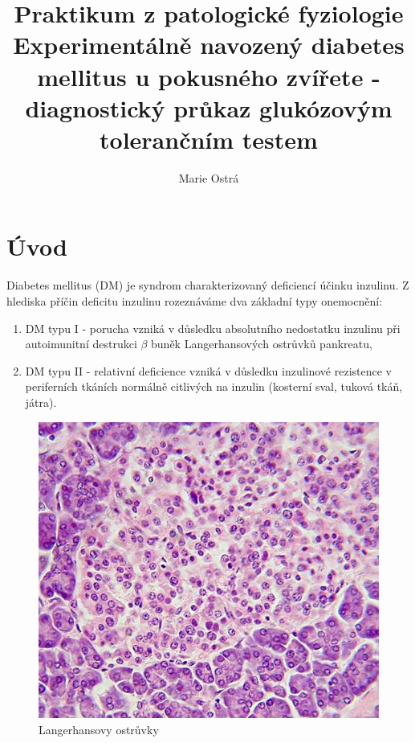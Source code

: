 \documentclass[12pt]{article}
\begin{document}
\title{Praktikum z patologické fyziologie \\
Experimentálně navozený diabetes
mellitus u pokusného zvířete - diagnostický
průkaz glukózovým tolerančním testem}
\author{Marie Ostrá}
\maketitle

\section{Úvod}

Diabetes mellitus (DM) je syndrom charakterizovaný deficiencí účinku inzulinu. Z hlediska
příčin deficitu inzulinu rozeznáváme dva základní typy onemocnění:
\begin{enumerate}
\item {DM typu I - porucha
vzniká v důsledku absolutního nedostatku inzulinu při autoimunitní destrukci $\beta$ buněk
Langerhansových ostrůvků pankreatu,} 
\item{DM typu II - relativní deficience vzniká v důsledku
inzulinové rezistence v periferních tkáních normálně citlivých na inzulin (kosterní sval, tuková
tkáň, játra).}
\end{enumerate}

\begin{figure}
  \vspace{-20pt}
  \begin{center}
	\includegraphics[width=\linewidth]{Langerhanssche_Insel.jpg}
	\caption{Langerhansovy ostrůvky}
  \end{center}
  \vspace{-20pt}
\end{figure}
\end{document}
